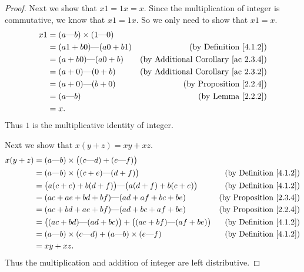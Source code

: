 \begin{proof}
    Next we show that \(x1 = 1x = x\).
    Since the multiplication of integer is commutative, we know that \(x1 = 1x\).
    So we only need to show that \(x1 = x\).
    \begin{align*}
        x1 & = (a \text{---} b) \times (1 \text{---} 0)                                                   \\
           & = (a1 + b0) \text{---} (a0 + b1)           & \text{(by Definition \ref{4.1.2})}              \\
           & = (a + b0) \text{---} (a0 + b)             & \text{(by Additional Corollary \ref{ac 2.3.4})} \\
           & = (a + 0) \text{---} (0 + b)               & \text{(by Additional Corollary \ref{ac 2.3.2})} \\
           & = (a + 0) \text{---} (b + 0)               & \text{(by Proposition \ref{2.2.4})}             \\
           & = (a \text{---} b)                         & \text{(by Lemma \ref{2.2.2})}                   \\
           & = x.
    \end{align*}
    Thus \(1\) is the multiplicative identity of integer.

    Next we show that \(x(y + z) = xy + xz\).
    \begin{align*}
        x(y + z) & = (a \text{---} b) \times \big((c \text{---} d) + (e \text{---} f)\big)                                                     \\
                 & = (a \text{---} b) \times \big((c + e) \text{---} (d + f)\big)                        & \text{(by Definition \ref{4.1.2})}  \\
                 & = \big(a(c + e) + b(d + f)\big) \text{---} \big(a(d + f) + b(c + e)\big)              & \text{(by Definition \ref{4.1.2})}  \\
                 & = (ac + ae + bd + bf) \text{---} (ad + af + bc + be)                                  & \text{(by Proposition \ref{2.3.4})} \\
                 & = (ac + bd + ae + bf) \text{---} (ad + bc + af + be)                                  & \text{(by Proposition \ref{2.2.4})} \\
                 & = \big((ac + bd) \text{---} (ad + bc)\big) + \big((ae + bf) \text{---} (af + be)\big) & \text{(by Definition \ref{4.1.2})}  \\
                 & = (a \text{---} b) \times (c \text{---} d) + (a \text{---} b) \times (e \text{---} f) & \text{(by Definition \ref{4.1.2})}  \\
                 & = xy + xz.
    \end{align*}
    Thus the multiplication and addition of integer are left distributive.


\end{proof}
